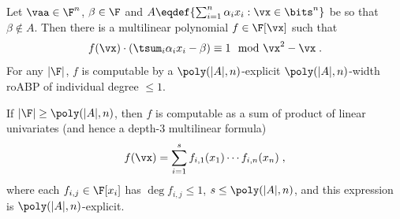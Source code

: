 \documentclass{toc}
\begin{document}
\begin{proposition}\label{res:ips-ubs:subset}
        Let $\vaa\in\F^n$, $\beta\in\F$ and $A\eqdef\{\sum_{i=1}^n \alpha_i x_i : \vx\in\bits^n\}$ be so that $\beta\notin A$. Then there is a multilinear polynomial $f\in\F[\vx]$ such that
        \[
                f(\vx)\cdot \left(\tsum_i \alpha_i x_i-\beta\right)\equiv 1\mod  \vx^2-\vx
                \;.
        \]
        For any $|\F|$, $f$ is computable by a $\poly(|A|,n)$-explicit $\poly(|A|,n)$-width roABP of individual degree $\le 1$.

        If $|\F|\ge\poly(|A|,n)$, then $f$ is computable as a sum of product of linear univariates (and hence a depth-3 multilinear formula)
        \[
                f(\vx)=\sum_{i=1}^s f_{i,1}(x_1)\cdots f_{i,n}(x_n)
                \;,
        \]
        where each $f_{i,j}\in\F[x_i]$ has $\deg f_{i,j}\le 1$, $s\le \poly(|A|,n)$, and this expression is $\poly(|A|,n)$-explicit.
\end{proposition}
\end{document}
